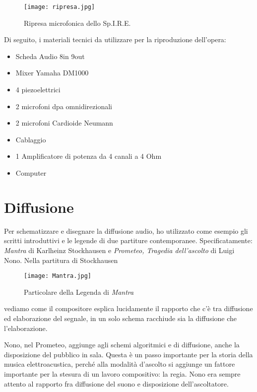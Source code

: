 \begin{figure}[htbp]
\begin{center}
\texttt{[image: ripresa.jpg]}
\caption{Ripresa microfonica dello Sp.I.R.E.}
\label{fig:micro}
\end{center}
\end{figure}

Di seguito, i materiali tecnici da utilizzare per la riproduzione dell'opera:

\begin{itemize}
	\item{Scheda Audio 8in 9out}
	\item{Mixer Yamaha DM1000}
	\item{4 piezoelettrici}
	\item{2 microfoni dpa omnidirezionali}
	\item{2 microfoni Cardioide Neumann}
	\item{Cablaggio}
	\item{1 Amplificatore di potenza da 4 canali a 4 Ohm}
	\item{Computer}
\end{itemize}


\section{Diffusione} 

Per schematizzare e disegnare la diffusione audio, ho utilizzato come esempio gli scritti introduttivi e le legende di due partiture contemporanee. Specificatamente: \textit{Mantra} di Karlheinz Stockhausen e \textit{Prometeo, Tragedia dell'ascolto} di Luigi Nono. Nella partitura di Stockhausen

\begin{figure}[htbp]
\begin{center}
\texttt{[image: Mantra.jpg]}
\caption{Particolare della Legenda di \textit{Mantra}}
\label{fig:mantra}
\end{center}
\end{figure}

vediamo come il compositore esplica lucidamente il rapporto che c'è tra diffusione ed elaborazione del segnale, in un solo schema racchiude sia la diffusione che l'elaborazione.

Nono, nel Prometeo, aggiunge agli schemi algoritmici e di diffusione, anche la disposizione del pubblico in sala. Questa è un passo importante per la storia della musica elettroacustica, perché alla modalità d'ascolto si aggiunge un fattore importante per la stesura di un lavoro compositivo: la regia. Nono era sempre attento al rapporto fra diffusione del suono e disposizione dell'ascoltatore.

